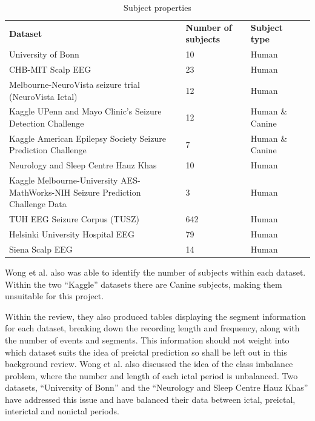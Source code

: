 \documentclass[12pt]{article}
\begin{document}
\begin{table}[H]
\centering
\begin{tabular}{p{}p{}p{}p{}}
\textbf{Dataset}                                                                & \textbf{Number of subjects} & \textbf{Subject type} & \textbf{} \\
University of Bonn                   & 10  & Human &  \\
CHB-MIT Scalp EEG                    & 23  & Human &  \\
Melbourne-NeuroVista seizure trial (NeuroVista Ictal)                           & 12                          & Human                 &           \\
Kaggle UPenn and Mayo Clinic's Seizure Detection Challenge                      & 12                          & Human \& Canine       &           \\
Kaggle American Epilepsy Society Seizure Prediction Challenge                   & 7                           & Human \& Canine       &           \\
Neurology and Sleep Centre Hauz Khas & 10  & Human &  \\
Kaggle Melbourne-University AES-MathWorks-NIH Seizure Prediction Challenge Data & 3                           & Human                 &           \\
TUH EEG Seizure Corpus (TUSZ)        & 642 & Human &  \\
Helsinki University Hospital EEG     & 79  & Human &  \\
Siena Scalp EEG                      & 14  & Human & 
\end{tabular}
\caption{Subject properties}
\end{table}

Wong et al. also was able to identify the number of subjects within each dataset. Within the two ``Kaggle'' datasets there are Canine subjects, making them unsuitable for this project. 

Within the review, they also produced tables displaying the segment information for each dataset, breaking down the recording length and frequency, along with the number of events and segments. This information should not weight into which dataset suits the idea of preictal prediction so shall be left out in this background review. Wong et al. also discussed the idea of the class imbalance problem, where the number and length of each ictal period is unbalanced. Two datasets, ``University of Bonn'' and the ``Neurology and Sleep Centre Hauz Khas'' have addressed this issue and have balanced their data between ictal, preictal, interictal and nonictal periods.
\end{document}
